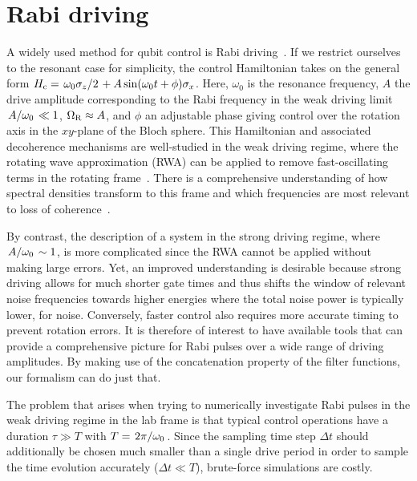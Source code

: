 \section{Rabi driving}\label{sec:ff:examples:rabi_driving}
A widely used method for qubit control is Rabi driving~\cite{Wallraff2004,Barends2014a,Soare2014,Veldhorst2014}.
If we restrict ourselves to the resonant case for simplicity, the control Hamiltonian takes on the general form $\Hc = \flatfrac{\omega_0\pz}{2} + A\sin(\omega_0 t + \phi)\px$.
Here, $\omega_0$ is the resonance frequency, $A$ the drive amplitude corresponding to the Rabi frequency in the weak driving limit $\flatfrac{A}{\omega_\mr{0}}\ll 1$, $\Omega_{\mathrm{R}}\approx A$, and $\phi$ an adjustable phase giving control over the rotation axis in the $xy$-plane of the Bloch sphere.
This Hamiltonian and associated decoherence mechanisms are well-studied in the weak driving regime, where the rotating wave approximation (RWA) can be applied to remove fast-oscillating terms in the rotating frame~\cite{Jaynes1963,Gerry2008}.
There is a comprehensive understanding of how spectral densities transform to this frame and which frequencies are most relevant to loss of coherence~\cite{Yan2013}.

By contrast, the description of a system in the strong driving regime, where $\flatfrac{A}{\omega_0}\sim 1$, is more complicated since the RWA cannot be applied without making large errors.
Yet, an improved understanding is desirable because strong driving allows for much shorter gate times and thus shifts the window of relevant noise frequencies towards higher energies where the total noise power is typically lower, \eg for \oneoverf noise.
Conversely, faster control also requires more accurate timing to prevent rotation errors.
It is therefore of interest to have available tools that can provide a comprehensive picture for Rabi pulses over a wide range of driving amplitudes.
By making use of the concatenation property of the filter functions, our formalism can do just that.

The problem that arises when trying to numerically investigate Rabi pulses in the weak driving regime in the lab frame is that typical control operations have a duration $\tau\gg T$ with $T = \flatfrac{2\pi}{\omega_0}$.
Since the sampling time step $\Delta t$ should additionally be chosen much smaller than a single drive period in order to sample the time evolution accurately ($\Delta t\ll T$), brute-force simulations are costly.

